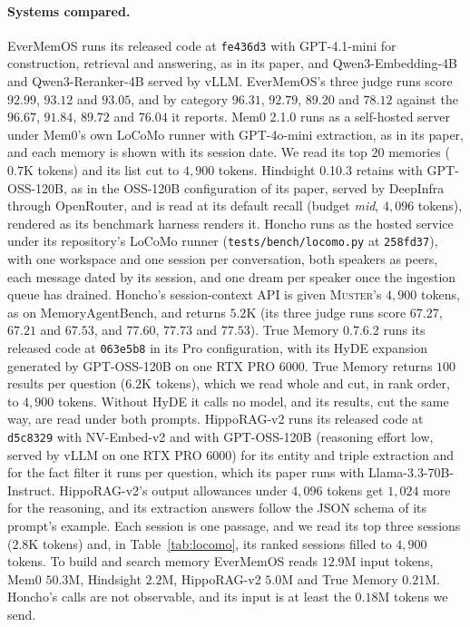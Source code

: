 \documentclass{article}
\newcommand{\sys}{\textsc{Muster}}
\begin{document}
\paragraph{Systems compared.} EverMemOS runs its released code at \texttt{fe436d3} with GPT-4.1-mini for construction, retrieval and answering, as in its paper, and Qwen3-Embedding-4B and Qwen3-Reranker-4B served by vLLM. EverMemOS's three judge runs score $92.99$, $93.12$ and $93.05$, and by category $96.31$, $92.79$, $89.20$ and $78.12$ against the $96.67$, $91.84$, $89.72$ and $76.04$ it reports. Mem0 2.1.0 runs as a self-hosted server under Mem0's own LoCoMo runner with GPT-4o-mini extraction, as in its paper, and each memory is shown with its session date. We read its top $20$ memories ($0.7$K tokens) and its list cut to $4{,}900$ tokens. Hindsight 0.10.3 retains with GPT-OSS-120B, as in the OSS-120B configuration of its paper, served by DeepInfra through OpenRouter, and is read at its default recall (budget \emph{mid}, $4{,}096$ tokens), rendered as its benchmark harness renders it. Honcho runs as the hosted service under its repository's LoCoMo runner (\texttt{tests/bench/locomo.py} at \texttt{258fd37}), with one workspace and one session per conversation, both speakers as peers, each message dated by its session, and one dream per speaker once the ingestion queue has drained. Honcho's session-context API is given \sys{}'s $4{,}900$ tokens, as on MemoryAgentBench, and returns $5.2$K (its three judge runs score $67.27$, $67.21$ and $67.53$, and $77.60$, $77.73$ and $77.53$). True Memory 0.7.6.2 runs its released code at \texttt{063e5b8} in its Pro configuration, with its HyDE expansion generated by GPT-OSS-120B on one RTX PRO 6000. True Memory returns $100$ results per question ($6.2$K tokens), which we read whole and cut, in rank order, to $4{,}900$ tokens. Without HyDE it calls no model, and its results, cut the same way, are read under both prompts. HippoRAG-v2 runs its released code at \texttt{d5c8329} with NV-Embed-v2 and with GPT-OSS-120B (reasoning effort low, served by vLLM on one RTX PRO 6000) for its entity and triple extraction and for the fact filter it runs per question, which its paper runs with Llama-3.3-70B-Instruct. HippoRAG-v2's output allowances under $4{,}096$ tokens get $1{,}024$ more for the reasoning, and its extraction answers follow the JSON schema of its prompt's example. Each session is one passage, and we read its top three sessions ($2.8$K tokens) and, in Table~\ref{tab:locomo}, its ranked sessions filled to $4{,}900$ tokens. To build and search memory EverMemOS reads $12.9$M input tokens, Mem0 $50.3$M, Hindsight $2.2$M, HippoRAG-v2 $5.0$M and True Memory $0.21$M. Honcho's calls are not observable, and its input is at least the $0.18$M tokens we send.
\end{document}
